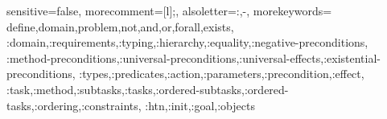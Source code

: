 {
  sensitive=false,    %
  morecomment=[l]{;}, %
  alsoletter={:,-},   %
  morekeywords={
    define,domain,problem,not,and,or,forall,exists,
    :domain,:requirements,:typing,:hierarchy,:equality,:negative-preconditions,
    :method-preconditions,:universal-preconditions,:universal-effects,:existential-preconditions,
    :types,:predicates,:action,:parameters,:precondition,:effect,
    :task,:method,:subtasks,:tasks,:ordered-subtasks,:ordered-tasks,:ordering,:constraints,
    :htn,:init,:goal,:objects
  }
}